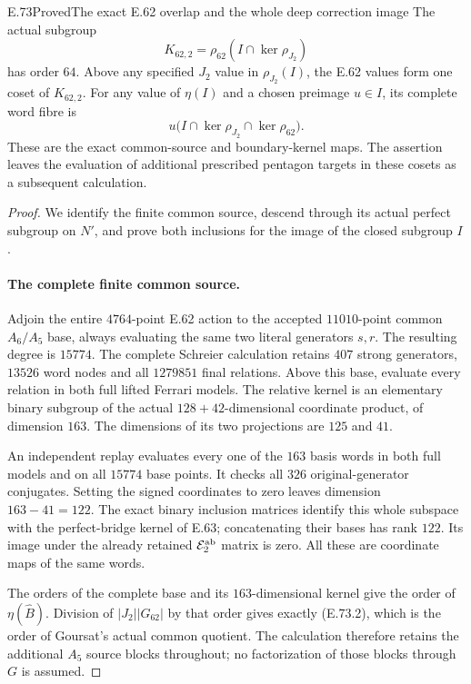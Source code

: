\begin{statement}{E.73}{Proved}{The exact E.62 overlap and the whole deep correction image}
The actual subgroup
\[
          K_{62,2}=\rho_{62}(I\cap\ker\rho_{J_2})
 \tag{E.73.7}
\]
has order $64$. Above any specified $J_2$ value in
$\rho_{J_2}(I)$, the E.62 values form one coset of
$K_{62,2}$. For any value of $\eta(I)$ and a chosen
preimage $u\in I$, its complete word fibre is
\[
              u\bigl(I\cap\ker\rho_{J_2}\cap\ker\rho_{62}\bigr).
 \tag{E.73.8}
\]
These are the exact common-source and boundary-kernel maps.
The assertion leaves the evaluation of additional prescribed
pentagon targets in these cosets as a subsequent calculation.
\end{statement}

\begin{proof}
We identify the finite common source, descend through its actual
perfect subgroup on $N'$, and prove both inclusions for the image
of the closed subgroup $I$.

\paragraph{The complete finite common source.}
Adjoin the entire $4764$-point E.62 action to the accepted
$11010$-point common $A_6/A_5$ base, always evaluating the same
two literal generators $s,r$. The resulting degree is $15774$.
The complete Schreier calculation retains $407$ strong generators,
$13526$ word nodes and all $1279851$ final relations. Above this
base, evaluate every relation in both full lifted Ferrari models.
The relative kernel is an elementary binary subgroup of the
actual $128+42$-dimensional coordinate product, of dimension
$163$. The dimensions of its two projections are $125$ and $41$.

An independent replay evaluates every one of the $163$ basis
words in both full models and on all $15774$ base points.
It checks all $326$ original-generator conjugates. Setting the
signed coordinates to zero leaves dimension $163-41=122$.
The exact binary inclusion matrices identify this whole subspace
with the perfect-bridge kernel of E.63; concatenating their
bases has rank $122$. Its image under the already retained
$\mathcal E_2^{\rm ab}$ matrix is zero. All these are coordinate
maps of the same words.

The orders of the complete base and its $163$-dimensional kernel
give the order of $\eta(\widehat B)$. Division of
$|J_2||G_{62}|$ by that order gives exactly (E.73.2), which is
the order of Goursat's actual common quotient. The calculation
therefore retains the additional $A_5$ source blocks throughout;
no factorization of those blocks through $G$ is assumed.


\end{proof}
